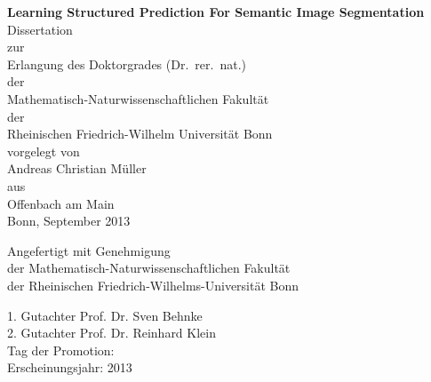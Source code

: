 \documentclass[12pt,toc=bibnumbered, a4paper,twoside,DIV=11,BCOR=.5cm]{scrbook}
\begin{document}
\begin{spacing}{1.6}
\begin{titlepage}

\begin{center}
\Large\sffamily
\vspace*{1cm}
\textbf{{\huge Learning Structured Prediction For Semantic Image Segmentation}}\\[5mm]
Dissertation\\%
zur\\%
Erlangung des Doktorgrades (Dr.\ rer.\ nat.)\\%
der\\%
Mathematisch-Naturwissenschaftlichen Fakult\"at\\%
der\\%
Rheinischen Friedrich-Wilhelm Universit\"at Bonn\\%
vorgelegt von\\%
{\LARGE Andreas Christian M\"uller}\\%
aus\\%
Offenbach am Main\\%
Bonn, September 2013
\end{center}
\end{titlepage}
%
\clearpage
{}
\setcounter{page}{2}
\vspace*{5cm}
\Large\sffamily
\begin{center}
Angefertigt mit Genehmigung\\
der Mathematisch-Naturwissenschaftlichen Fakult\"at\\
der Rheinischen Friedrich-Wilhelms-Universit\"at Bonn\\
\end{center}
1. Gutachter Prof. Dr. Sven Behnke\\
2. Gutachter Prof. Dr. Reinhard Klein\\
Tag der Promotion:\\
Erscheinungsjahr: 2013\\
\end{spacing}
\tableofcontents
\end{document}

